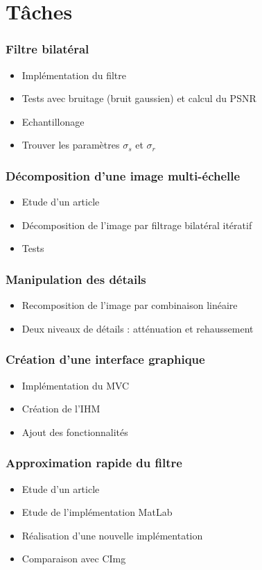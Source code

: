 \documentclass{polytech-presentation}
\begin{document}
\section{Tâches}
		\begin{frame}
		\frametitle{Filtre bilatéral}	
		\begin{itemize}
			\item Implémentation du filtre
			\item Tests avec bruitage (bruit gaussien) et calcul du PSNR
			\item Echantillonage
			\item Trouver les paramètres $\sigma_s$ et $\sigma_r$ 
		\end{itemize}
		\end{frame}

		\begin{frame}
		\frametitle{Décomposition d'une image multi-échelle}
		\begin{itemize}
			\item Etude d'un article
			\item Décomposition de l'image par filtrage bilatéral itératif
			\item Tests 
		\end{itemize}
		\end{frame}
	
		\begin{frame}
			\frametitle{Manipulation des détails}
			\begin{itemize}
				\item Recomposition de l'image par combinaison linéaire
				\item Deux niveaux de détails : atténuation et rehaussement
			\end{itemize}
		\end{frame}
		
		\begin{frame}
			\frametitle{Création d'une interface graphique}
			\begin{itemize}
				\item Implémentation du MVC
				\item Création de l'IHM
				\item Ajout des fonctionnalités
			\end{itemize}
		\end{frame}
	
		\begin{frame}
			\frametitle{Approximation rapide du filtre}
			\begin{itemize}
				\item Etude d'un article
				\item Etude de l'implémentation MatLab
				\item Réalisation d'une nouvelle implémentation
				\item Comparaison avec CImg
			\end{itemize}
		\end{frame}
		
\end{document}
